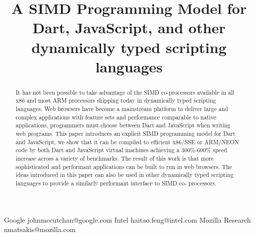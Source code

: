 \documentclass[preprint]{sigplanconf}
\begin{document}
\setlength{\pdfpageheight}{\paperheight}
\setlength{\pdfpagewidth}{\paperwidth}






\title{A SIMD Programming Model for Dart, JavaScript, and other dynamically typed scripting languages}

           {Google}
           {johnmccutchan@google.com}
           {Intel}
           {haitao.feng@intel.com}
           {Mozilla Research}
           {nmatsakis@mozilla.com}

\maketitle

\begin{abstract}

It has not been possible to take advantage of the SIMD co-processors available
in all x86 and most ARM processors shipping today in dynamically typed scripting
languages. Web browsers have become a mainstream platform to deliver large and
complex applications with feature sets and performance comparable to native
applications, programmers must choose between Dart and JavaScript when writing
web programs. This paper introduces an explicit SIMD programming model for Dart
and JavaScript, we show that it can be compiled to efficient x86/SSE or ARM/NEON
code by both Dart and JavaScript virtual machines achieving a 300\%-600\% speed
increase across a variety of benchmarks. The result of this work is that more
sophisticated and performant applications can be built to run in web browsers.
The ideas introduced in this paper can also be used in other dynamically typed
scripting languages to provide a similarly performant interface to SIMD co-
processors.

\end{abstract}
\end{document}
